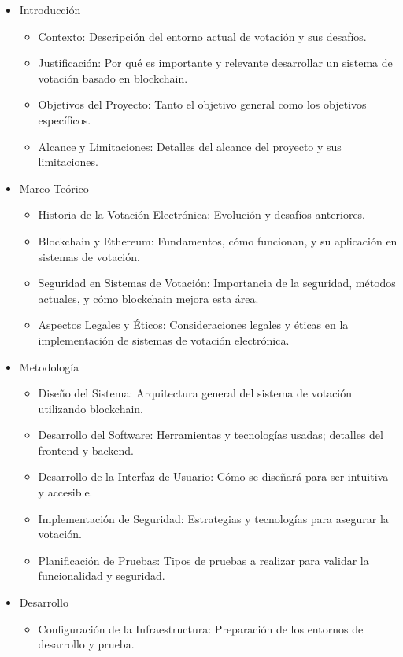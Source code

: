 \documentclass{report}
\begin{document}
	\begin{itemize}
		\item Introducción
		\begin{itemize}
			\item Contexto: Descripción del entorno actual de votación y sus desafíos.
			\item Justificación: Por qué es importante y relevante desarrollar un sistema de votación basado en blockchain.
			\item Objetivos del Proyecto: Tanto el objetivo general como los objetivos específicos.
			\item Alcance y Limitaciones: Detalles del alcance del proyecto y sus limitaciones.
		\end{itemize}
		\item Marco Teórico
		\begin{itemize}
			\item Historia de la Votación Electrónica: Evolución y desafíos anteriores.
			\item Blockchain y Ethereum: Fundamentos, cómo funcionan, y su aplicación en sistemas de votación.
			\item Seguridad en Sistemas de Votación: Importancia de la seguridad, métodos actuales, y cómo blockchain mejora esta área.
			\item Aspectos Legales y Éticos: Consideraciones legales y éticas en la implementación de sistemas de votación electrónica.
		\end{itemize}
		\item Metodología
		\begin{itemize}
			\item Diseño del Sistema: Arquitectura general del sistema de votación utilizando blockchain.
			\item Desarrollo del Software: Herramientas y tecnologías usadas; detalles del frontend y backend.
			\item Desarrollo de la Interfaz de Usuario: Cómo se diseñará para ser intuitiva y accesible.
			\item Implementación de Seguridad: Estrategias y tecnologías para asegurar la votación.
			\item Planificación de Pruebas: Tipos de pruebas a realizar para validar la funcionalidad y seguridad.
		\end{itemize}
		\item Desarrollo
		\begin{itemize}
			\item Configuración de la Infraestructura: Preparación de los entornos de desarrollo y prueba.

\end{itemize}
\end{itemize}
\end{document}
